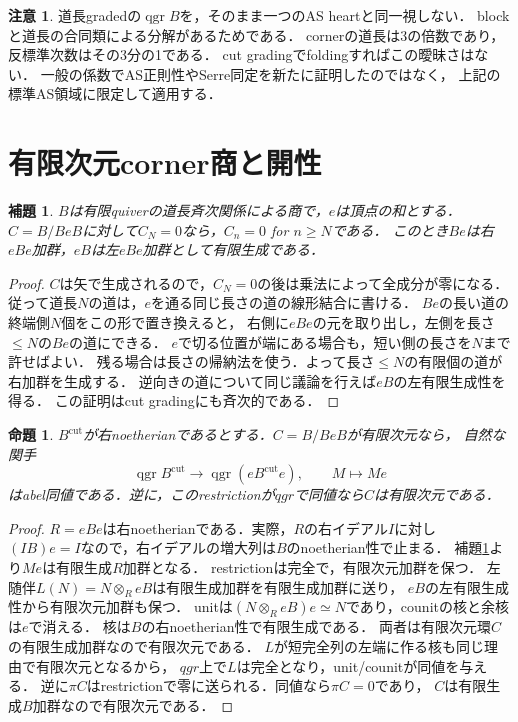\documentclass[11pt,a4paper]{ltjsarticle}
\newtheorem{proposition}[theorem]{命題}
\newtheorem{lemma}[theorem]{補題}
\theoremstyle{definition}\newtheorem{remark}[theorem]{注意}
\DeclareMathOperator{\qgr}{qgr}\DeclareMathOperator{\Hom}{Hom}\DeclareMathOperator{\Ext}{Ext}
\begin{document}
\begin{remark}
道長gradedの$\qgr B$を，そのまま一つのAS heartと同一視しない．
blockと道長の合同類による分解があるためである．
cornerの道長は3の倍数であり，反標準次数はその3分の1である．
cut gradingでfoldingすればこの曖昧さはない．
一般の係数でAS正則性やSerre同定を新たに証明したのではなく，
上記の標準AS領域に限定して適用する．
\end{remark}

\section{有限次元corner商と開性}
\begin{lemma}\label{lem:finite}
$B$は有限quiverの道長斉次関係による商で，$e$は頂点の和とする．
$C=B/BeB$に対して$C_N=0$なら，$C_n=0$ for $n\ge N$である．
このとき$Be$は右$eBe$加群，$eB$は左$eBe$加群として有限生成である．
\end{lemma}
\begin{proof}
$C$は矢で生成されるので，$C_N=0$の後は乗法によって全成分が零になる．
従って道長$N$の道は，$e$を通る同じ長さの道の線形結合に書ける．
$Be$の長い道の終端側$N$個をこの形で置き換えると，
右側に$eBe$の元を取り出し，左側を長さ$\le N$の$Be$の道にできる．
$e$で切る位置が端にある場合も，短い側の長さを$N$まで許せばよい．
残る場合は長さの帰納法を使う．よって長さ$\le N$の有限個の道が右加群を生成する．
逆向きの道について同じ議論を行えば$eB$の左有限生成性を得る．
この証明はcut gradingにも斉次的である．
\end{proof}

\begin{proposition}\label{prop:corner}
$B^{\mathrm{cut}}$が右noetherianであるとする．$C=B/BeB$が有限次元なら，
自然な関手
\begin{equation}\label{eq:equiv}
 \qgr B^{\mathrm{cut}}\longrightarrow\qgr(eB^{\mathrm{cut}}e),\qquad M\longmapsto Me
\end{equation}
はabel同値である．逆に，このrestrictionが$qgr$で同値なら$C$は有限次元である．
\end{proposition}
\begin{proof}
$R=eBe$は右noetherianである．実際，$R$の右イデアル$I$に対し
$(IB)e=I$なので，右イデアルの増大列は$B$のnoetherian性で止まる．
補題\ref{lem:finite}より$Me$は有限生成$R$加群となる．
restrictionは完全で，有限次元加群を保つ．
左随伴$L(N)=N\otimes_R eB$は有限生成加群を有限生成加群に送り，
$eB$の左有限生成性から有限次元加群も保つ．
unitは$(N\otimes_R eB)e\simeq N$であり，counitの核と余核は$e$で消える．
核は$B$の右noetherian性で有限生成である．
両者は有限次元環$C$の有限生成加群なので有限次元である．
$L$が短完全列の左端に作る核も同じ理由で有限次元となるから，
$qgr$上で$L$は完全となり，unit/counitが同値を与える．
逆に$\pi C$はrestrictionで零に送られる．同値なら$\pi C=0$であり，
$C$は有限生成$B$加群なので有限次元である．
\end{proof}
\end{document}
